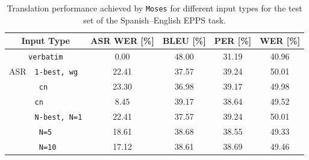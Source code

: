 \documentclass[11pt]{report}
\theoremstyle{plain}
\begin{document}
{\begin{table}[t]
\caption{Translation performance achieved by {\tt Moses} for different input types for the test set of the Spanish--English EPPS task.}
\begin{center}
\begin{tabular}{|l|l||c||ccc|}
\hline
\multicolumn{2}{|c||}{Input Type}                & ASR WER [\%]     & BLEU [\%] 	& PER [\%] 	& WER [\%] \\
\hline \hline
\multicolumn{2}{|c||}{{\tt verbatim}}   & \phantom{0}0.00      & 48.00 & 31.19 & 40.96 \\
 \hline \hline
ASR & {\tt 1-best, wg}        & 22.41 & 37.57 & 39.24 & 50.01 \\
&{\tt \phantom{1-best,} cn}  & 23.30  & 36.98 & 39.17 & 49.98  \\
 \cline{2-6}
&{\tt cn}               &\phantom{0}8.45     & 39.17 & 38.64 & 49.52 \\
 \cline{2-6}
&{\tt N-best, N=1}        & 22.41 & 37.57 & 39.24 & 50.01 \\
&{\tt \phantom{N-best,} N=5}        & 18.61 & 38.68 & 38.55 & 49.33 \\
&{\tt \phantom{N-best,} N=10}      & 17.12 & 38.61 & 38.69 & 49.46 \\
 \hline
 \end{tabular}
\end{center}
\label{tbl:epps-results}
\end{table}


}
\end{document}
